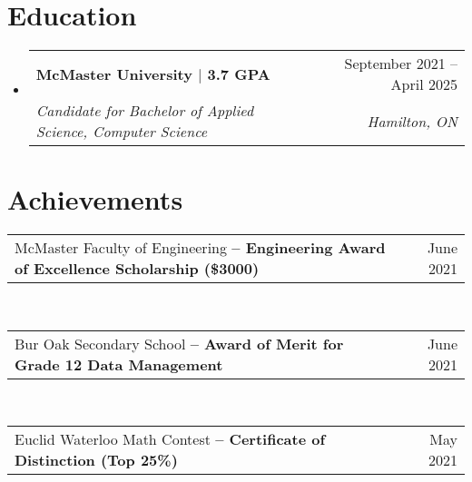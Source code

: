 \documentclass[letterpaper,11pt]{article}
\makeatletter
\newcommand{\resumeSubheading}[4]{
  \vspace{-2pt}\item
    \begin{tabular*}{0.97\textwidth}[t]{l@{\extracolsep{\fill}}r}
      \textbf{#1} & #2 \\
      \textit{\small#3} & \textit{\small #4} \\
    \end{tabular*}\vspace{-7pt}
}
\newcommand{\resumeDatedList}[2]{
    \vspace{-2pt}\item
    \begin{tabular*}{0.97\textwidth}[t]{l@{\extracolsep{\fill}}r}
        #1 & #2 \\
    \end{tabular*}
}
\newcommand{\resumeSubHeadingListStart}{\begin{itemize}[leftmargin=0.15in, label={}]}
\newcommand{\resumeSubHeadingListEnd}{\end{itemize}}
\newcommand{\resumeListStart}{\begin{itemize}[itemindent=-0.33in,leftmargin=0.48in, label={}]}
\newcommand{\resumeListEnd}{\end{itemize}}
\makeatother
\begin{document}
\section{Education}
    \resumeSubHeadingListStart
        \resumeSubheading
            {McMaster University $|$ 3.7 GPA}{September 2021 -- April 2025}
            {Candidate for Bachelor of Applied Science, Computer Science}{Hamilton, ON}
    \resumeSubHeadingListEnd


%
\section{Achievements}
    \resumeListStart\small{
        \resumeDatedList{McMaster Faculty of Engineering \textbf{-- Engineering Award of Excellence Scholarship (\$3000)}}{June 2021} \\
        \resumeDatedList{Bur Oak Secondary School \textbf{-- Award of Merit for Grade 12 Data Management}}{June 2021} \\
        \resumeDatedList{Euclid Waterloo Math Contest \textbf{-- Certificate of Distinction (Top 25\%)}}{May 2021} \\
    } \resumeListEnd

\end{document}
